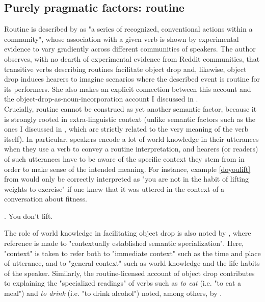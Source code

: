 \subsection{Purely pragmatic factors: routine} 
Routine is described by \textcite[2]{Glass2020} as "a series of recognized, conventional actions within a community", whose association with a given verb is shown by experimental evidence to vary gradiently across different communities of speakers. The author observes, with no dearth of experimental evidence from Reddit communities, that transitive verbs describing routines facilitate object drop and, likewise, object drop induces hearers to imagine scenarios where the described event is routine for its performers. She also makes an explicit connection between this account and the object-drop-as-noun-incorporation account I discussed in .\\
Crucially, routine cannot be construed as yet another semantic factor, because it is strongly rooted in extra-linguistic context (unlike semantic factors such as the ones I discussed in , which are strictly related to the very meaning of the verb itself). In particular, speakers encode a lot of world knowledge in their utterances when they use a verb to convey a routine interpretation, and hearers (or readers) of such utterances have to be aware of the specific context they stem from in order to make sense of the intended meaning. For instance, example \ref{doyoulift} from \textcite[9]{Glass2020} would only be correctly interpreted as "you are not in the habit of lifting weights to exercise" if one knew that it was uttered in the context of a conversation about fitness.

\ex. \label{doyoulift} You don't lift.

The role of world knowledge in facilitating object drop is also noted by \textcite[528]{Eu2018}, where reference is made to "contextually established semantic specialization". Here, "context" is taken to refer both to "immediate context" such as the time and place of utterance, and to "general context" such as world knowledge and the life habits of the speaker. Similarly, the routine-licensed account of object drop contributes to explaining the "specialized readings" of verbs such as \textit{to eat} (i.e. "to eat a meal") and \textit{to drink} (i.e. "to drink alcohol") noted, among others, by \textcite[420]{Naess2011}.


